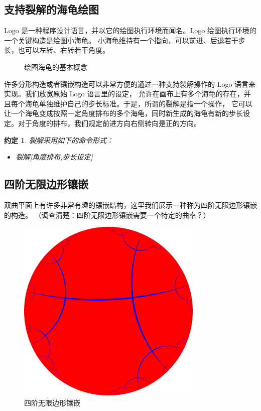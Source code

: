 \documentclass[a4paper,12pt]{article}
\newtheorem{convention}{约定}
\begin{document}
\subsection{支持裂解的海龟绘图}

Logo 是一种程序设计语言，并以它的绘图执行环境而闻名。Logo 绘图执行环境的一个关键构造是绘图小海龟。
小海龟维持有一个指向，可以前进、后退若干步长，也可以左转、右转若干角度。

\begin{figure}[ht]
\centering
{}
\caption{绘图海龟的基本概念}
\end{figure}

许多分形构造或者镶嵌构造可以非常方便的通过一种支持裂解操作的 Logo 语言来实现。我们放宽原始 Logo 语言里的设定，
允许在画布上有多个海龟的存在，并且每个海龟单独维护自己的步长标准。于是，所谓的裂解是指一个操作，
它可以让一个海龟变成按照一定角度排布的多个海龟，同时新生成的海龟有新的步长设定。对于角度的排布，我们规定前进方向右侧转向是正的方向。

\begin{convention}
裂解采用如下的命令形式：
\begin{itemize}
\item 裂解[角度排布;步长设定]
\end{itemize}
\end{convention}

\subsection{四阶无限边形镶嵌}

双曲平面上有许多非常有趣的镶嵌结构，这里我们展示一种称为四阶无限边形镶嵌的构造。
（调查清楚：四阶无限边形镶嵌需要一个特定的曲率？）

\begin{figure}[ht]
\centering
\includegraphics[width=3.5in]{images/H2_tiling_24i-1.png}
\caption{四阶无限边形镶嵌}
\end{figure}
\end{document}
